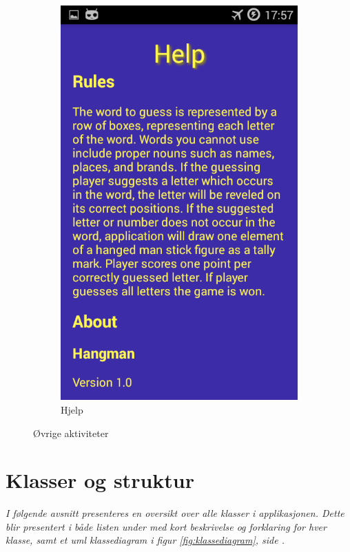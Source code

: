 \begin{figure}[ht]
\begin{subfigure}[b]{0.3\textwidth}
        \includegraphics[width=\textwidth]{./img/bruksanvisning/13.png}
        \caption{Hjelp}
        \label{fig:aktivitet_hjelp}
    \end{subfigure}
    \caption{Øvrige aktiviteter}\label{fig:aktiviteter_ovrige}
\end{figure}



\chapter{Klasser og struktur}

\emph{I følgende avsnitt presenteres en oversikt over alle klasser i applikasjonen. Dette blir presentert i både listen under med kort beskrivelse og forklaring for hver klasse, samt et uml klassediagram i figur \ref{fig:klassediagram}, side \pageref{fig:klassediagram}.}
\\

